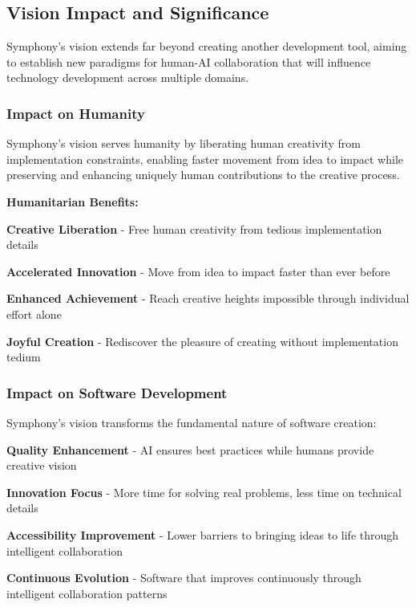 \subsection{Vision Impact and Significance}
\label{subsec:vision-impact}

Symphony's vision extends far beyond creating another development tool, aiming to establish new paradigms for human-AI collaboration that will influence technology development across multiple domains.

\subsubsection{Impact on Humanity}

\begin{infobox}[title=Amplifying Human Potential]
Symphony's vision serves humanity by liberating human creativity from implementation constraints, enabling faster movement from idea to impact while preserving and enhancing uniquely human contributions to the creative process.
\end{infobox}

\textbf{Humanitarian Benefits:}

\begin{compactlist}
    \item \textbf{Creative Liberation} - Free human creativity from tedious implementation details
    \item \textbf{Accelerated Innovation} - Move from idea to impact faster than ever before
    \item \textbf{Enhanced Achievement} - Reach creative heights impossible through individual effort alone
    \item \textbf{Joyful Creation} - Rediscover the pleasure of creating without implementation tedium
\end{compactlist}

\subsubsection{Impact on Software Development}

Symphony's vision transforms the fundamental nature of software creation:

\begin{expandedlist}
    \item \textbf{Quality Enhancement} - AI ensures best practices while humans provide creative vision
    
    \item \textbf{Innovation Focus} - More time for solving real problems, less time on technical details
    
    \item \textbf{Accessibility Improvement} - Lower barriers to bringing ideas to life through intelligent collaboration
    
    \item \textbf{Continuous Evolution} - Software that improves continuously through intelligent collaboration patterns
\end{expandedlist}

